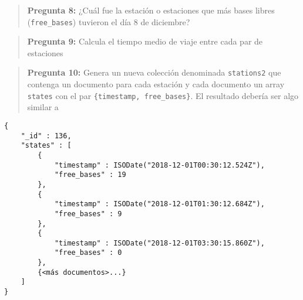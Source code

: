 \documentclass[]{article}
\begin{document}
\begin{quote}
\textbf{Pregunta 8:} ¿Cuál fue la estación o estaciones que más bases
libres (\texttt{free\_bases}) tuvieron el día 8 de diciembre?
\end{quote}

\begin{quote}
\textbf{Pregunta 9:} Calcula el tiempo medio de viaje entre cada par de
estaciones
\end{quote}

\begin{quote}
\textbf{Pregunta 10:} Genera un nueva colección denominada
\texttt{stations2} que contenga un documento para cada estación y cada
documento un array \texttt{states} con el par
\texttt{\{timestamp,\ free\_bases\}}. El resultado debería ser algo
similar a
\end{quote}

\begin{verbatim}
{
    "_id" : 136,
    "states" : [
        {
            "timestamp" : ISODate("2018-12-01T00:30:12.524Z"),
            "free_bases" : 19
        },
        {
            "timestamp" : ISODate("2018-12-01T01:30:12.684Z"),
            "free_bases" : 9
        },
        {
            "timestamp" : ISODate("2018-12-01T03:30:15.860Z"),
            "free_bases" : 0
        },
        {<más documentos>...}
    ]
}
\end{verbatim}
\end{document}
